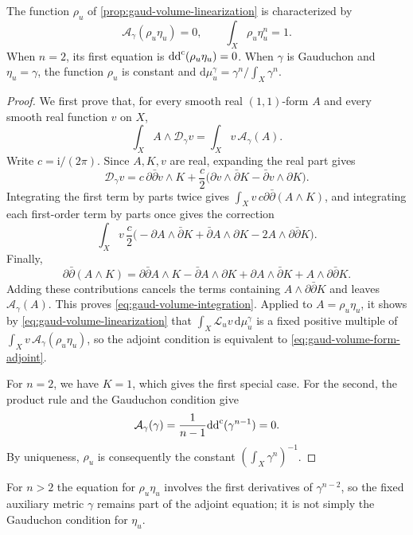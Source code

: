 \begin{proposition}\label{prop:gaud-volume-form-adjoint}
The function $\rho_u$ of \cref{prop:gaud-volume-linearization} is characterized by
\begin{equation}\label{eq:gaud-volume-form-adjoint}
 \mathcal A_\gamma(\rho_u\eta_u)=0,
 \qquad \int_X\rho_u\eta_u^n=1.
\end{equation}
When $n=2$, its first equation is $\mathrm{dd}^{\mathrm{c}}(\rho_u\eta_u)=0$.
When $\gamma$ is Gauduchon and $\eta_u=\gamma$, the function $\rho_u$ is constant and
$\mathrm{d}\mu_u^\gamma=\gamma^n/\int_X\gamma^n$.
\end{proposition}
\begin{proof}
We first prove that, for every smooth real $(1,1)$-form $A$ and every smooth real function $v$ on $X$,
\begin{equation}\label{eq:gaud-volume-integration}
 \int_X A\wedge\mathcal D_\gamma v
 =\int_X v\,\mathcal A_\gamma(A).
\end{equation}
Write $c=\mathrm i/(2\pi)$. Since $A,K,v$ are real, expanding the real part gives
\[
 \mathcal D_\gamma v
 =c\,\partial\bar\partial v\wedge K
  +\frac c2\bigl(\partial v\wedge\bar\partial K
                   -\bar\partial v\wedge\partial K\bigr).
\]
Integrating the first term by parts twice gives
$\int_Xv\,c\partial\bar\partial(A\wedge K)$,
and integrating each first-order term by parts once gives the correction
\[
 \int_Xv\,\frac c2
 \bigl(-\partial A\wedge\bar\partial K
       +\bar\partial A\wedge\partial K
       -2A\wedge\partial\bar\partial K\bigr).
\]
Finally,
\[
 \partial\bar\partial(A\wedge K)
 =\partial\bar\partial A\wedge K
   -\bar\partial A\wedge\partial K
   +\partial A\wedge\bar\partial K
   +A\wedge\partial\bar\partial K.
\]
Adding these contributions cancels the terms containing $A\wedge\partial\bar\partial K$ and leaves $\mathcal A_\gamma(A)$. This proves \eqref{eq:gaud-volume-integration}. Applied to $A=\rho_u\eta_u$, it shows by \eqref{eq:gaud-volume-linearization} that $\int_X\mathcal L_uv\,\mathrm{d}\mu_u^\gamma$ is a fixed positive multiple of $\int_Xv\,\mathcal A_\gamma(\rho_u\eta_u)$, so the adjoint condition is equivalent to \eqref{eq:gaud-volume-form-adjoint}.

For $n=2$, we have $K=1$, which gives the first special case. For the second, the product rule and the Gauduchon condition give
\[
 \mathcal A_\gamma(\gamma)
 =\frac1{n-1}\mathrm{dd}^{\mathrm{c}}(\gamma^{n-1})=0.
\]
By uniqueness, $\rho_u$ is consequently the constant $(\int_X\gamma^n)^{-1}$.
\end{proof}

For $n>2$ the equation for $\rho_u\eta_u$ involves the first derivatives of $\gamma^{n-2}$, so the fixed auxiliary metric $\gamma$ remains part of the adjoint equation; it is not simply the Gauduchon condition for $\eta_u$.

